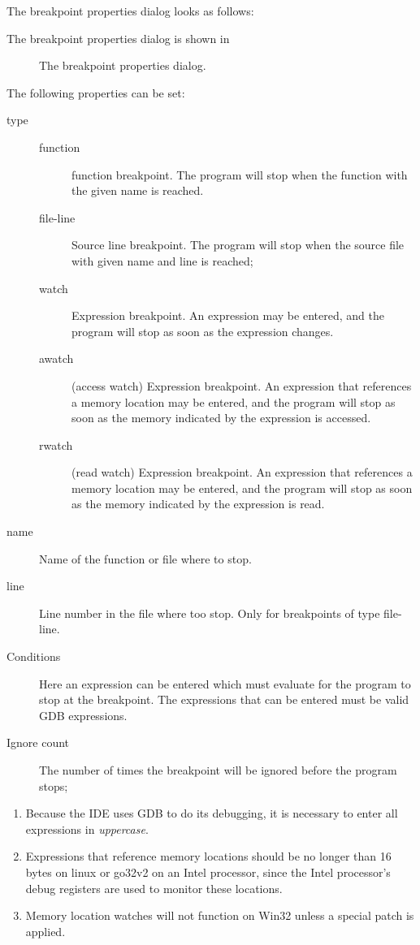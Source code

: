 \begin{htmlonly}
The breakpoint properties dialog looks as follows:
\end{htmlonly}
\begin{latexonly}
The breakpoint properties dialog is shown in 
\begin{figure}[ht]
\caption{The breakpoint properties dialog.}\label{fig:brkprop}
\ifpdf
{}
\else
{}
\fi
\end{figure}
\end{latexonly}
The following properties can be set:
\begin{description}
\item[type]
\begin{description}
\item[function] function breakpoint. The program will stop when the function
with the given name is reached.
\item[file-line] Source line breakpoint. The program will stop when the
source file with given name and line is reached;
\item[watch] Expression breakpoint. An expression may be entered, and the
program will stop as soon as the expression changes.
\item[awatch] (access watch) Expression breakpoint. An expression that references a 
memory location may be entered, and the program will stop as soon as 
the memory indicated by the expression is accessed.
\item[rwatch] (read watch) Expression breakpoint. An expression that references a
memory location may be entered, and the program will stop as soon as 
the memory indicated by the expression is read.
\end{description}
\item[name] Name of the function or file where to stop.
\item[line] Line number in the file where too stop. Only for breakpoints of
type file-line.
\item[Conditions] Here an expression can be entered which must evaluate 
 for the program to stop at the breakpoint. The expressions that
can be entered must be valid GDB expressions.
\item[Ignore count] The number of times the breakpoint will be ignored
before the program stops; 
\end{description}
\begin{remark}
\begin{enumerate}
\item Because the IDE uses GDB to do its debugging, it is necessary to enter all
expressions in {\em uppercase}. 
\item Expressions that reference memory locations should be no longer than 16 
bytes on linux or go32v2 on an Intel processor, since the Intel processor's 
debug registers are used to monitor these locations.
\item Memory location watches will not function on Win32 unless a special 
patch is applied. 
\end{enumerate}
\end{remark}

